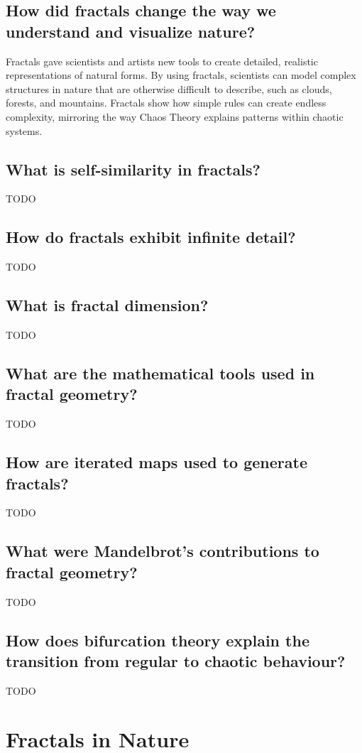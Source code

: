 \documentclass[12pt]{article}
\begin{document}
\subsection{How did fractals change the way we understand and visualize nature?}
Fractals gave scientists and artists new tools to create detailed, realistic representations of natural forms. By using fractals, scientists can model complex structures in nature that are otherwise difficult to describe, such as clouds, forests, and mountains. Fractals show how simple rules can create endless complexity, mirroring the way Chaos Theory explains patterns within chaotic systems.

\subsection{What is self-similarity in fractals?}
TODO

\subsection{How do fractals exhibit infinite detail?}
TODO

\subsection{What is fractal dimension?}
TODO

\subsection{What are the mathematical tools used in fractal geometry?}
TODO

\subsection{How are iterated maps used to generate fractals?}
TODO

\subsection{What were Mandelbrot's contributions to fractal geometry?}
TODO

\subsection{How does bifurcation theory explain the transition from regular to chaotic behaviour?}
TODO

\section{Fractals in Nature}
\end{document}
